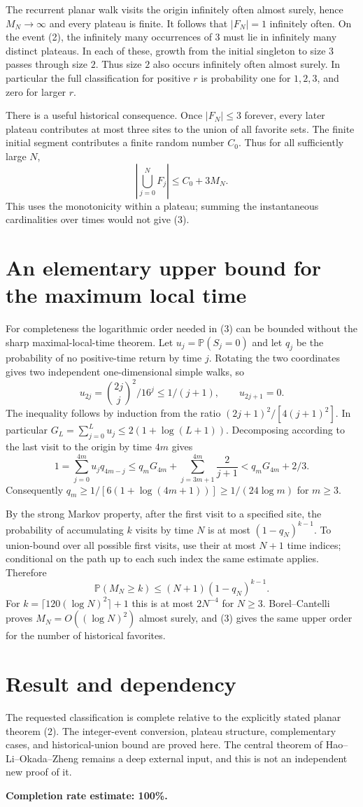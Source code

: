 \documentclass[11pt]{article}
\begin{document}
The recurrent planar walk visits the origin infinitely often almost surely, hence $M_N\to\infty$ and every plateau is finite. It follows that $|F_N|=1$ infinitely often. On the event (2), the infinitely many occurrences of $3$ must lie in infinitely many distinct plateaus. In each of these, growth from the initial singleton to size $3$ passes through size $2$. Thus size $2$ also occurs infinitely often almost surely. In particular the full classification for positive $r$ is probability one for $1,2,3$, and zero for larger $r$.

There is a useful historical consequence. Once $|F_N|\le3$ forever, every later plateau contributes at most three sites to the union of all favorite sets. The finite initial segment contributes a finite random number $C_0$. Thus for all sufficiently large $N$,
\[
 \left|\bigcup_{j=0}^N F_j\right|\le C_0+3M_N.\tag{3}
\]
This uses the monotonicity within a plateau; summing the instantaneous cardinalities over times would not give (3).

\section*{An elementary upper bound for the maximum local time}
For completeness the logarithmic order needed in (3) can be bounded without the sharp maximal-local-time theorem. Let $u_j=\mathbb P(S_j=0)$ and let $q_j$ be the probability of no positive-time return by time $j$. Rotating the two coordinates gives two independent one-dimensional simple walks, so
\[
 u_{2j}=\binom{2j}{j}^2/16^j\le1/(j+1),\qquad u_{2j+1}=0.
\]
The inequality follows by induction from the ratio $(2j+1)^2/[4(j+1)^2]$. In particular $G_L=\sum_{j=0}^Lu_j\le2(1+\log(L+1))$. Decomposing according to the last visit to the origin by time $4m$ gives
\[
 1=\sum_{j=0}^{4m}u_jq_{4m-j}
 \le q_mG_{4m}+\sum_{j=3m+1}^{4m}\frac2{j+1}
 <q_mG_{4m}+2/3.
\]
Consequently $q_m\ge1/[6(1+\log(4m+1))]\ge1/(24\log m)$ for $m\ge3$.

By the strong Markov property, after the first visit to a specified site, the probability of accumulating $k$ visits by time $N$ is at most $(1-q_N)^{k-1}$. To union-bound over all possible first visits, use their at most $N+1$ time indices; conditional on the path up to each such index the same estimate applies. Therefore
\[
 \mathbb P(M_N\ge k)\le(N+1)(1-q_N)^{k-1}.
\]
For $k=\lceil120(\log N)^2\rceil+1$ this is at most $2N^{-4}$ for $N\ge3$. Borel--Cantelli proves $M_N=O((\log N)^2)$ almost surely, and (3) gives the same upper order for the number of historical favorites.

\section*{Result and dependency}
The requested classification is complete relative to the explicitly stated planar theorem (2). The integer-event conversion, plateau structure, complementary cases, and historical-union bound are proved here. The central theorem of Hao--Li--Okada--Zheng remains a deep external input, and this is not an independent new proof of it.

\textbf{Completion rate estimate: 100\%.}
\end{document}
